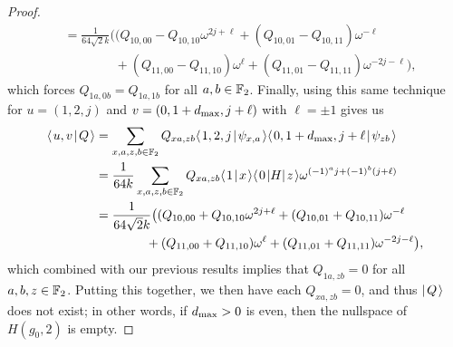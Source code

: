 \documentclass[../thesis-main/thesis-main]{subfiles}
\begin{document}
\begin{proof}
\begin{align}
  &= \frac{1}{64\sqrt{2} k} \big( (Q_{10,00} - Q_{10,10} \omega^{2j + \ell} + (Q_{10,01} - Q_{10,11})\omega^{-\ell} \nonumber\\
  &\qquad \qquad + (Q_{11,00} - Q_{11,10})\omega^{\ell} + (Q_{11,01} - Q_{11,11})\omega^{-2j - \ell}\big),
\end{align}
which forces $Q_{1a,0b} = Q_{1a,1b}$ for all $a,b\in \mathbb{F}_2$.  Finally, using this same technique for $u = (1,2,j)$ and $v = (0,1+d_{\text{max}}, j+\ell)$ with $\ell = \pm 1$ gives us
\begin{align}
  \langle\mspace{2mu} u,v \mspace{2mu} | \mspace{2mu} Q\mspace{2mu} \rangle &= \sum_{x,a,z,b\in \mathbb{F}_2} Q_{xa,zb} \langle\mspace{2mu} 1,2,j \mspace{2mu} | \mspace{2mu} \psi_{x,a}\mspace{2mu} \rangle\langle\mspace{2mu} 0,1+d_{\text{max}},j+\ell \mspace{2mu} | \mspace{2mu} \psi_{zb}\mspace{2mu} \rangle\\
  &=\frac{1}{64 k} \sum_{x,a,z,b\in \mathbb{F}_2} Q_{xa,zb} \langle\mspace{2mu} 1 \mspace{2mu} | \mspace{2mu} x\mspace{2mu} \rangle \langle\mspace{2mu} 0 \mspace{2mu} | H |\mspace{2mu} z \mspace{2mu} \rangle \omega^{(-1)^a j+ (-1)^b (j+\ell)}\\
  &= \frac{1}{64\sqrt{2} k} \big( (Q_{10,00} + Q_{10,10} \omega^{2j + \ell} + (Q_{10,01} + Q_{10,11})\omega^{-\ell} \nonumber\\
  &\qquad \qquad + (Q_{11,00} + Q_{11,10})\omega^{\ell} + (Q_{11,01} + Q_{11,11})\omega^{-2j - \ell}\big),
\end{align}
which combined with our previous results implies that $Q_{1a,zb} = 0$ for all $a,b,z\in\mathbb{F}_2$.  Putting this together, we then have each $Q_{xa,zb} = 0$, and thus $|\mspace{2mu} Q \mspace{2mu} \rangle$ does not exist; in other words, if $d_{\text{max}} >0$ is even, then the nullspace of $H(g_0,2)$ is empty.


\end{proof}
\end{document}
